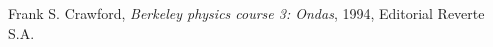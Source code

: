 \documentclass[11pt,a4paper]{article}
\begin{document}

\begin{thebibliography}{1}
  Frank S. Crawford, \textit{Berkeley physics course 3: Ondas}, 1994, Editorial Reverte S.A.
\end{thebibliography}
 
\end{document}
